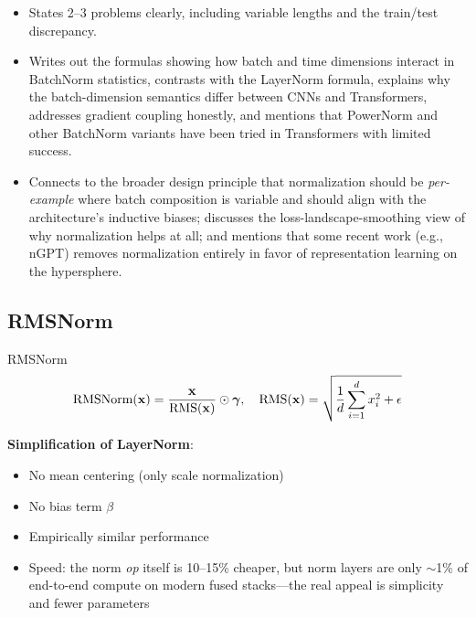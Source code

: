 \begin{interviewq}
\goodgreat
\begin{itemize}
    \item {} States 2--3 problems clearly, including variable lengths and the train/test discrepancy.
    \item {} Writes out the formulas showing how batch and time dimensions interact in BatchNorm statistics, contrasts with the LayerNorm formula, explains why the batch-dimension semantics differ between CNNs and Transformers, addresses gradient coupling honestly, and mentions that PowerNorm and other BatchNorm variants have been tried in Transformers with limited success.
    \item {} Connects to the broader design principle that normalization should be \textit{per-example} where batch composition is variable and should align with the architecture's inductive biases; discusses the loss-landscape-smoothing view of why normalization helps at all; and mentions that some recent work (e.g., nGPT) removes normalization entirely in favor of representation learning on the hypersphere.
\end{itemize}

\end{interviewq}

\subsection{RMSNorm}

\begin{mathresult}{RMSNorm}
\begin{equation}
\text{RMSNorm}(\mathbf{x}) = \frac{\mathbf{x}}{\text{RMS}(\mathbf{x})} \odot \bm{\gamma}, \quad \text{RMS}(\mathbf{x}) = \sqrt{\frac{1}{d}\sum_{i=1}^d x_i^2 + \epsilon}
\end{equation}
\end{mathresult}

\textbf{Simplification of LayerNorm}:
\begin{itemize}
    \item No mean centering (only scale normalization)
    \item No bias term $\beta$
    \item Empirically similar performance
    \item Speed: the norm \textit{op} itself is 10--15\% cheaper, but norm layers are only $\sim$1\% of end-to-end compute on modern fused stacks---the real appeal is simplicity and fewer parameters
\end{itemize}

